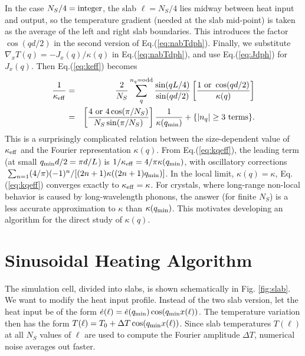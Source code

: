 \documentclass[aps,prb,twocolumn,showpacs,superscriptaddress]{revtex4-1}\begin{tiny}\end{tiny}
\begin{document}
%
In the case $N_S/4 = {\rm integer}$, the slab $\ell=N_S/4$ lies midway between heat input and output,
so the temperature gradient (needed at the slab mid-point) is taken as the average of the left
and right slab boundaries.  This introduces the factor $\cos(qd/2)$ in the second version of Eq.(\ref{eq:nabTdph}).
Finally, we substitute $\nabla_x T(q) = -J_x(q)/\kappa(q)$ in Eq.(\ref{eq:nabTdph}), and use 
Eq.(\ref{eq:Jdph}) for $J_x(q)$.  Then Eq.(\ref{eq:keff}) becomes
%
\begin{eqnarray}
\frac{1}{\kappa_{\rm eff}} &=& \frac{2}{N_S}\sum_q^{n_q={\rm odd}} \frac{\sin(qL/4)}{\sin(qd/2)} 
\left[ \frac{1 \ {\rm or} \ \cos(qd/2)}{\kappa(q)} \right] \nonumber \\
&=& \left[ \frac{4 \ {\rm or} \ 4\cos(\pi/N_S)}{N_S\sin(\pi/N_S)} \right] \frac{1}{\kappa(q_{\rm min})}
+\{|n_q| \ge 3 \ {\rm terms}\}. \nonumber \\
\label{eq:kqeff}
\end{eqnarray}
%
This is a surprisingly complicated relation between the size-dependent value
of $\kappa_{\rm eff}$ and the Fourier representation $\kappa(q)$.   
From Eq.(\ref{eq:kqeff}), the leading term (at small $q_{\rm min}d/2=\pi d/L$)
is $1/\kappa_{\rm eff}=4/\pi\kappa(q_{\rm min})$, with oscillatory
corrections $~\sum_{n=1} (4/\pi) (-1)^n /[(2n+1)\kappa((2n+1)q_{\rm min})]$.  
In the local limit, $\kappa(q)=\kappa$,
Eq.(\ref{eq:kqeff}) converges exactly to $\kappa_{\rm eff}=\kappa$. 
For crystals, where long-range non-local behavior is caused by long-wavelength
phonons, the answer (for finite $N_S$) is a
less accurate approximation to $\kappa$ than $\kappa(q_{\rm min})$.  
This motivates developing an algorithm for the direct study of $\kappa(q)$.


\section{Sinusoidal Heating Algorithm}

The simulation cell, divided into slabs,
is shown schematically in Fig. \ref{fig:slab}.
We want to modify
the heat input profile.  Instead of the two slab version, let the heat input be of the form
${\dot e}(\ell)={\dot e}(q_{\rm min})\cos(q_{\rm min}x(\ell))$.  
The temperature variation then has the form $T(\ell)=T_0+\Delta T \cos(q_{\rm min}x(\ell))$. 
Since slab temperatures $T(\ell)$ at all $N_S$ values of $\ell$ 
are used to compute the Fourier amplitude $\Delta T$, numerical noise 
averages out faster.
\end{document}
